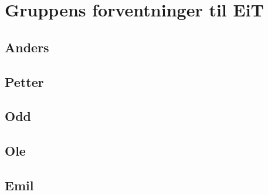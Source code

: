\section{Gruppens forventninger til EiT}

\subsection{Anders}

\vspace{\secspace}

\subsection{Petter}

\vspace{\secspace}

\subsection{Odd}

\vspace{\secspace}

\subsection{Ole}

\vspace{\secspace}

\subsection{Emil}

\vspace{\secspace}

